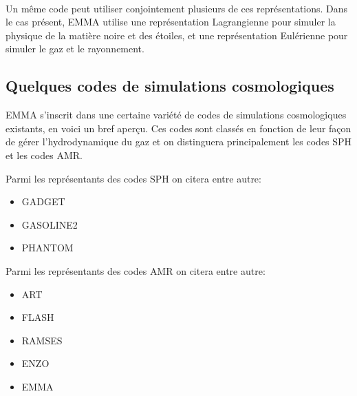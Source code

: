 
\paragraph{}
Un même code peut utiliser conjointement plusieurs de ces représentations.
Dans le cas présent, EMMA utilise une représentation Lagrangienne pour simuler la physique de la matière noire et des étoiles, et une représentation Eulérienne pour simuler le gaz et le rayonnement.

\subsection{Quelques codes de simulations cosmologiques}

EMMA s'inscrit dans une certaine variété de codes de simulations cosmologiques existants, en voici un bref aperçu.
Ces codes sont classés en fonction de leur façon de gérer l'hydrodynamique du gaz et on distinguera principalement les codes \ac{SPH} et les codes \ac{AMR}.

Parmi les représentants des codes \ac{SPH} on citera entre autre:
\begin{itemize}
\item GADGET \citep{springel_cosmological_2005}
\item GASOLINE2 \citep{2017arXiv170703824W}
\item PHANTOM \citep{2017arXiv170203930P}
\end{itemize}

Parmi les représentants des codes \ac{AMR} on citera entre autre:
\begin{itemize}
\item ART \citep{1997ApJS..111...73K}
\item FLASH \citep{0067-0049-131-1-273}
\item RAMSES \citep{teyssier_cosmological_2002}
\item ENZO \citep{bryan_enzo:_2014}
\item EMMA \citep{aubert_emma:_2015}
\end{itemize}

